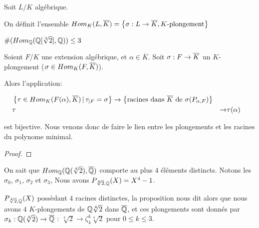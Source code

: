 \begin{definition}
	Soit $L/K$ algébrique.

	On définit l'ensemble $Hom_{K}(L, \overline{K}) =
	\left\{ \sigma : L \rightarrow \overline{K}, \text{$K$-plongement} \right\}$
\end{definition}

\begin{exemple}
	$\#(Hom_{\mathbb{Q}}(\mathbb{Q}[\sqrt[3]{2}], \mathbb{Q})) \leq 3$
\end{exemple}


\begin{proposition}
	Soient $F/K$ une extension algébrique, et $\alpha \in \overline{K}$.
	Soit $\sigma : F \rightarrow \overline{K}$ un $K$-plongement ($\sigma \in
	Hom_{K}(F, \overline{K})$).

	Alors l'application:

	\begin{align*}
		& \left\{\tau \in Hom_{K}(F(\alpha), \overline{K}) \, | \, \tau_{|F} =
		\sigma \right\} \rightarrow \left\{ \text{racines dans $\overline{K}$ de
		$\sigma(P_{\alpha, F})$} \right\} \\
		& \tau &\rightarrow& \tau(\alpha)
	\end{align*}

	est bijective. Nous venons donc de faire le lien entre les plongements et
	les racines du polynome minimal.
\end{proposition}

\ifdefined\outputproof
\begin{proof}

\end{proof}
\fi

\begin{exemple}
	On sait que
	$Hom_{\mathbb{Q}}(\mathbb{Q}(\sqrt[4]{2}), \overline{\mathbb{Q}})$
	comporte au plus $4$ éléments distincts. Notons les $\sigma_{0}$, $\sigma_{1}$,
	$\sigma_{2}$ et $\sigma_{3}$,
	Nous avons $P_{\sqrt[4]{2}, \mathbb{Q}}(X) = X^{4} - 1$.

	$P_{\sqrt[4]{2}, \mathbb{Q}}(X)$ possèdant $4$ racines distinctes, la
	proposition nous dit alors que nous avons $4$
	$K$-plongements de $\mathbb{Q}{\sqrt[4]{2}}$ dans $\overline{\mathbb{Q}}$, et
	ces plongements sont donnés par
	$\sigma_{k} : \mathbb{Q}(\sqrt[4]{2}) \rightarrow \overline{\mathbb{Q}}$ :
	$\sqrt[4]{2} \rightarrow \zeta^{k}_{4} \sqrt[4]{2}$ pour $0 \leq k \leq 3$.
\end{exemple}

